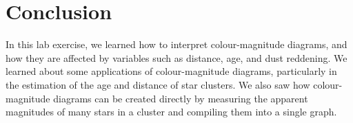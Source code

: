 \documentclass[11pt]{article}
\begin{document}
\section{Conclusion}
In this lab exercise, we learned how to interpret colour-magnitude diagrams, and how they are affected by variables such as distance, age, and dust reddening.
We learned about some applications of colour-magnitude diagrams, particularly in the estimation of the age and distance of star clusters.
We also saw how colour-magnitude diagrams can be created directly by measuring the apparent magnitudes of many stars in a cluster and compiling them into a single graph.


\printbibliography
\end{document}
